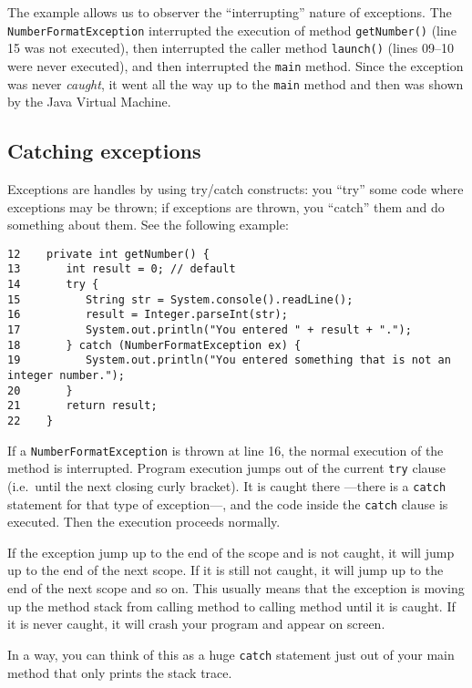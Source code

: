The example allows us to observer the ``interrupting'' nature of
exceptions. The \verb+NumberFormatException+ interrupted the execution
of method \verb+getNumber()+ (line 15 was not executed), then
interrupted the caller method \verb+launch()+ (lines 09--10 were never
executed), and then interrupted the \verb+main+ method. Since the
exception was never \emph{caught}, it went all the way up to the
\verb+main+ method and then was shown by the Java Virtual Machine. 

\subsection{Catching exceptions}
\label{sec:catching-exception}

Exceptions are handles by using try/catch constructs: you ``try'' some
code where exceptions may be thrown; if exceptions are thrown, you
``catch'' them and do something about them. See the following example: 

\begin{verbatim}
12    private int getNumber() {
13       int result = 0; // default
14       try { 
15          String str = System.console().readLine();
16          result = Integer.parseInt(str);
17          System.out.println("You entered " + result + ".");
18       } catch (NumberFormatException ex) {
19          System.out.println("You entered something that is not an integer number.");
20       }
21       return result;
22    }
\end{verbatim}

If a \verb+NumberFormatException+ is thrown at line 16, the normal
execution of the method is interrupted. Program execution jumps out of
the current \verb+try+ clause (i.e.~until the next closing curly
bracket). It is caught there ---there is a \verb+catch+ statement for
that type of exception---, and the code inside the \verb+catch+ clause is 
executed. Then the execution proceeds normally. 

If the exception jump up to the end of the scope and is not caught, it
will jump up to the end of the next scope. If it is still not caught,
it will jump up to the end of the next scope and so on. This usually
means that the exception is moving up the method stack from calling
method to calling method until it is caught. If it is never caught, it
will crash your program and appear on screen. 

In a way, you can think
of this as a huge \verb+catch+ statement just out of your main method
that only prints the stack trace.

